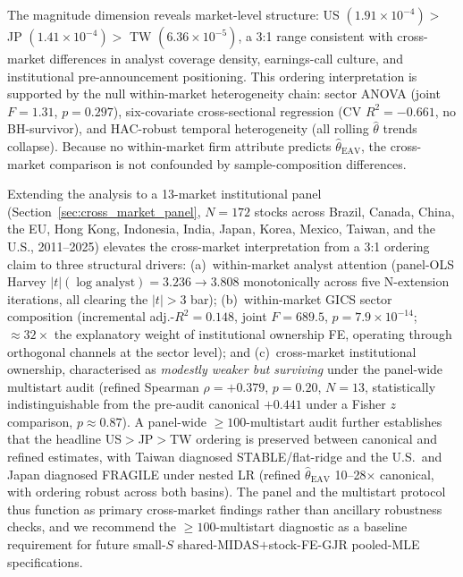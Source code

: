 \documentclass[12pt,a4paper]{article}
\begin{document}
The magnitude dimension reveals market-level structure: US
$(1.91\times10^{-4}) >$ JP $(1.41\times10^{-4}) >$ TW
$(6.36\times10^{-5})$, a 3:1 range consistent with cross-market
differences in analyst coverage density, earnings-call culture, and
institutional pre-announcement positioning. This ordering interpretation
is supported by the null within-market heterogeneity chain: sector ANOVA
(joint $F = 1.31$, $p = 0.297$), six-covariate cross-sectional
regression (CV $R^2 = -0.661$, no BH-survivor), and HAC-robust
temporal heterogeneity (all rolling $\hat{\theta}$ trends
collapse). Because no within-market firm attribute predicts
$\hat{\theta}_{\mathrm{EAV}}$, the cross-market comparison is not
confounded by sample-composition differences.

Extending the analysis to a 13-market institutional panel
(Section~\ref{sec:cross_market_panel}, $N = 172$ stocks across Brazil, Canada,
China, the EU, Hong Kong, Indonesia, India, Japan, Korea, Mexico, Taiwan, and
the U.S., 2011--2025) elevates the cross-market interpretation from a 3:1
ordering claim to three structural drivers: (a)~within-market analyst attention
(panel-OLS Harvey $|t|(\log\mathrm{analyst}) = 3.236 \to 3.808$ monotonically
across five N-extension iterations, all clearing the \citet{harvey2016}
$|t| > 3$ bar); (b)~within-market GICS sector composition (incremental
adj.-$R^2 = 0.148$, joint $F = 689.5$, $p = 7.9\times10^{-14}$;
$\approx 32\times$ the explanatory weight of institutional ownership FE,
operating through orthogonal channels at the sector level); and (c)~cross-market
institutional ownership, characterised as \emph{modestly weaker but surviving}
under the panel-wide multistart audit (refined Spearman $\rho = +0.379$,
$p = 0.20$, $N = 13$, statistically indistinguishable from the pre-audit canonical
$+0.441$ under a Fisher $z$ comparison, $p \approx 0.87$). A panel-wide
$\geq 100$-multistart audit further establishes that the headline US$>$JP$>$TW
ordering is preserved between canonical and refined estimates, with Taiwan
diagnosed STABLE/flat-ridge and the U.S.\ and Japan diagnosed FRAGILE under
nested LR (refined $\hat{\theta}_{\mathrm{EAV}}$ 10--28$\times$ canonical, with
ordering robust across both basins). The panel and the multistart protocol thus
function as primary cross-market findings rather than ancillary robustness
checks, and we recommend the $\geq 100$-multistart diagnostic as a baseline
requirement for future small-$S$ shared-MIDAS$+$stock-FE-GJR pooled-MLE
specifications.
\end{document}
